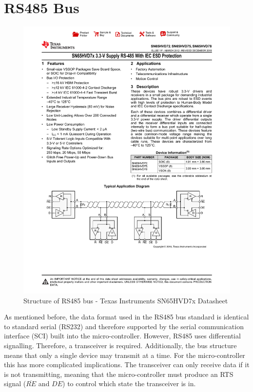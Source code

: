 \section{RS485 Bus}

\begin{figure}[H]
    \centering \includegraphics[width=1.0\textwidth]{./figures/rs485_structure.pdf}
    \caption{Structure of RS485 bus - Texas Instruments SN65HVD7x Datasheet\cite{RS485TransceiverDatasheet}}
    \label{fig:rs485_structure}
\end{figure}

As mentioned before, the data format used in the RS485 bus standard is identical to standard serial (RS232) and therefore supported by the serial communication interface (SCI) built into the micro-controller. However, RS485 uses differential signalling. Therefore, a transceiver is required. Additionally, the bus structure means that only a single device may transmit at a time. For the micro-controller this has more complicated implications. The transceiver can only receive data if it is not transmitting, meaning that the micro-controller must produce an RTS signal ($\overline{RE}$ and $DE$) to control which state the transceiver is in.

